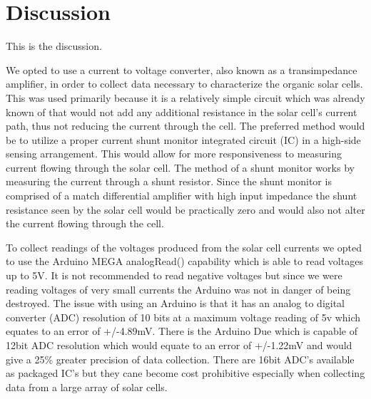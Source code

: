 \section{Discussion}
\label{sec:Discussion}

This is the discussion.

We opted to use a current to voltage converter, also known as a transimpedance amplifier, in order to collect data necessary to characterize the organic solar cells.
This was used primarily because it is a relatively simple circuit which was already known of that would not add any additional resistance in the solar cell's current path, thus not reducing the current through the cell.
The preferred method would be to utilize a proper current shunt monitor integrated circuit (IC) in a high-side sensing arrangement.
This would allow for more responsiveness to measuring current flowing through the solar cell.
The method of a shunt monitor works by measuring the current through a shunt resistor.
Since the shunt monitor is comprised of a match differential amplifier with high input impedance the shunt resistance seen by the solar cell would be practically zero and would also not alter the current flowing through the cell.

To collect readings of the voltages produced from the solar cell currents we opted to use the Arduino MEGA analogRead() capability which is able to read voltages up to 5V.
It is not recommended to read negative voltages but since we were reading voltages of very small currents the Arduino was not in danger of being destroyed.
The issue with using an Arduino is that it has an analog to digital converter (ADC) resolution of 10 bits at a maximum voltage reading of 5v which equates to an error of +/-4.89mV.
There is the Arduino Due which is capable of 12bit ADC resolution which would equate to an error of +/-1.22mV and would give a 25\% greater precision of data collection.
There are 16bit ADC's available as packaged IC's but they cane become cost prohibitive especially when collecting data from a large array of solar cells.
